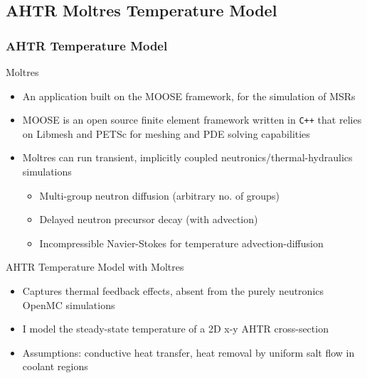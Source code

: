 \subsection{AHTR Moltres Temperature Model}
\begin{frame}
    \frametitle{AHTR Temperature Model}
    \begin{block}{Moltres \cite{lindsay_introduction_2018}}
        \begin{itemize}
			\item An application built on the \gls{MOOSE} framework, for the simulation of 
            MSRs
            \item \gls{MOOSE} \cite{gaston_moose:_2009} is an open source finite
			element framework written in \texttt{C++} that
			relies on Libmesh and PETSc for meshing and PDE solving capabilities
			\item Moltres can run transient, implicitly coupled
			neutronics/thermal-hydraulics simulations
			\begin{itemize}
				\item Multi-group neutron diffusion (arbitrary no. of groups)
				\item Delayed neutron precursor decay (with advection)
				\item Incompressible Navier-Stokes for temperature
				advection-diffusion
			\end{itemize}
		\end{itemize}
    \vspace{-0.2cm}
    \end{block}
    \begin{block}{AHTR Temperature Model with Moltres}
        \begin{itemize}
            \item Captures thermal feedback effects, absent from the purely neutronics OpenMC
            simulations
            \item I model the steady-state temperature of a 2D x-y AHTR cross-section
            \item Assumptions: conductive heat transfer, heat removal by uniform 
            salt flow in coolant regions
        \end{itemize}
    \end{block}
\end{frame}

